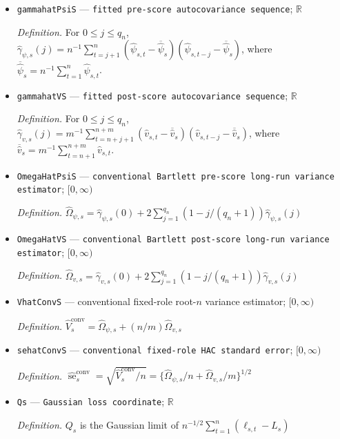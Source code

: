 \documentclass{article}
\begin{document}
\begin{itemize}
  \item \texttt{gammahatPsiS} --- \texttt{fitted pre-\allowbreak{}score autocovariance sequence}; \(\mathbb R\)
  \par\smallskip\noindent\emph{Definition.} For \(0\leq j\leq q_n\), \(\widehat\gamma_{\psi,s}(j)=n^{-1}\sum_{t=j+1}^{n}(\widehat\psi_{s,t}-\overline{\widehat\psi}_s)(\widehat\psi_{s,t-j}-\overline{\widehat\psi}_s)\), where \(\overline{\widehat\psi}_s=n^{-1}\sum_{t=1}^n\widehat\psi_{s,t}\).
  \item \texttt{gammahatVS} --- \texttt{fitted post-\allowbreak{}score autocovariance sequence}; \(\mathbb R\)
  \par\smallskip\noindent\emph{Definition.} For \(0\leq j\leq q_n\), \(\widehat\gamma_{v,s}(j)=m^{-1}\sum_{t=n+j+1}^{n+m}(\widehat v_{s,t}-\overline{\widehat v}_s)(\widehat v_{s,t-j}-\overline{\widehat v}_s)\), where \(\overline{\widehat v}_s=m^{-1}\sum_{t=n+1}^{n+m}\widehat v_{s,t}\).
  \item \texttt{OmegaHatPsiS} --- \texttt{conventional Bartlett pre-\allowbreak{}score long-\allowbreak{}run variance estimator}; \([0,\infty)\)
  \par\smallskip\noindent\emph{Definition.} \(\widehat\Omega_{\psi,s}=\widehat\gamma_{\psi,s}(0)+2\sum_{j=1}^{q_n}(1-j/(q_n+1))\widehat\gamma_{\psi,s}(j)\)
  \item \texttt{OmegaHatVS} --- \texttt{conventional Bartlett post-\allowbreak{}score long-\allowbreak{}run variance estimator}; \([0,\infty)\)
  \par\smallskip\noindent\emph{Definition.} \(\widehat\Omega_{v,s}=\widehat\gamma_{v,s}(0)+2\sum_{j=1}^{q_n}(1-j/(q_n+1))\widehat\gamma_{v,s}(j)\)
  \item \texttt{VhatConvS} --- conventional fixed-role root-\(n\) variance estimator; \([0,\infty)\)
  \par\smallskip\noindent\emph{Definition.} \(\widehat V_s^{\mathrm{conv}}=\widehat\Omega_{\psi,s}+(n/m)\widehat\Omega_{v,s}\)
  \item \texttt{sehatConvS} --- \texttt{conventional fixed-\allowbreak{}role HAC standard error}; \([0,\infty)\)
  \par\smallskip\noindent\emph{Definition.} \(\widehat{\operatorname{se}}^{\mathrm{conv}}_s=\sqrt{\widehat V_s^{\mathrm{conv}}/n}=\{\widehat\Omega_{\psi,s}/n+\widehat\Omega_{v,s}/m\}^{1/2}\)
  \item \texttt{Qs} --- \texttt{Gaussian loss coordinate}; \(\mathbb R\)
  \par\smallskip\noindent\emph{Definition.} \(Q_s\) is the Gaussian limit of \(n^{-1/2}\sum_{t=1}^n(\ell_{s,t}-L_s)\)

\end{itemize}
\end{document}
